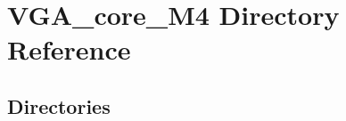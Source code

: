 \section{V\+G\+A\+\_\+core\+\_\+\+M4 Directory Reference}
\label{dir_032edb87c1122e3e937a79b7cc5729c3}
\subsection*{Directories}
\begin{DoxyCompactItemize}
\end{DoxyCompactItemize}
